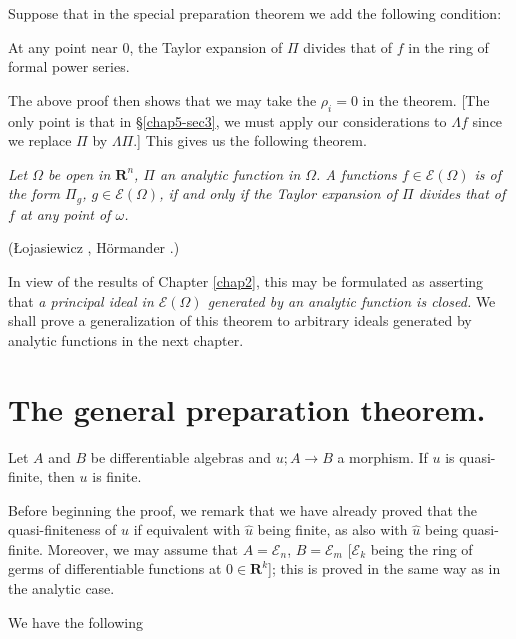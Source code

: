 \begin{remark*}
Suppose that in the special preparation theorem we add the following condition:
\end{remark*}  
  
At any point near 0, the Taylor expansion of $\Pi$ divides that of $f$ in the ring of formal power series.

The above proof then shows that we may take the $\rho_i = 0$ in the theorem. [The only point is that in \S \ref{chap5-sec3}, we must apply our considerations to $\Lambda f$ since we replace $\Pi$ by $\Lambda \Pi$.] This gives us the following theorem.

\textit{Let $\Omega$ be open in $\mathbf{R}^n$, $\Pi$ an analytic function in $\Omega$. A functions $f \in \mathscr{E}(\Omega)$ is of the form $\Pi_g$, $g \in \mathscr{E} (\Omega)$, if and only if the Taylor expansion of $\Pi$ divides that of $f$ at any point of $\omega$.}

({\L}ojasiewicz \cite{S. Lojasiewicz : 1}, H\"ormander \cite{L. Hormander : 1}.)

In view of the results of Chapter \ref{chap2}, this may be formulated as asserting  that \textit{a principal ideal in $\mathscr{E}(\Omega)$ generated by an analytic function is closed.} We shall prove a generalization of this theorem to arbitrary ideals generated by analytic functions in the next chapter. 

\section[The general preparation theorem]{The general preparation theorem.}\label{chap5-sec4}
\pageoriginale

\begin{theorem}\label{chap5-thm4.1}
Let $A$ and $B$ be differentiable algebras and $u ; A \to B$ a morphism. If $u$ is quasi-finite, then $u$ is finite. 
\end{theorem}

Before beginning the proof, we remark that we have already proved that the quasi-finiteness of $u$ if equivalent with $\widehat{u}$ being finite, as also with $\widehat{u}$ being quasi-finite. Moreover, we may assume that $A = \mathscr{E}_n$, $B = \mathscr{E}_m$ [$\mathscr{E}_k$ being the ring of germs of differentiable functions at $0 \in \mathbf{R}^k$]; this is proved in the same way as in the analytic case.

We have the following

